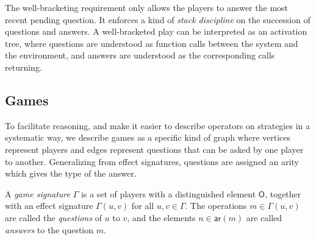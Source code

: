 \documentclass[sigplan,screen]{acmart}
\newcommand{\kw}[1]{\ensuremath{ \mathsf{#1} }}
\begin{document}

The well-bracketing requirement only allows the players
to answer the most recent pending question.
It enforces a kind of \emph{stack discipline}
on the succession of questions and answers.
A well-bracketed play
can be interpreted as an activation tree,
where questions are understood as function calls
between the system and the environment,
and answers are understood as the
corresponding calls returning.


\subsection{Games} %

To facilitate reasoning,
and make it easier to describe operators on strategies
in a systematic way,
we describe games as a specific kind of graph
where vertices represent players
and edges represent questions that can be asked
by one player to another.
Generalizing from effect signatures,
questions are assigned an arity
which gives the type of the answer.

\begin{definition}
A \emph{game signature} $\Gamma$
is a set of players with a distinguished element $\kw{O}$,
together with an effect signature $\Gamma(u, v)$
for all $u, v \in \Gamma$.
The operations $m \in \Gamma(u, v)$ are called
the \emph{questions} of $u$ to $v$,
and the elements $n \in \kw{ar}(m)$ are called
\emph{answers} to the question $m$.
\end{definition}
\end{document}
